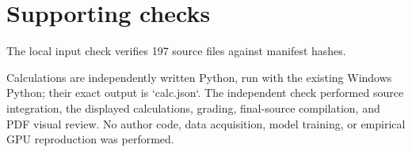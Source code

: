 \documentclass[10pt]{article}
\begin{document}
\section*{Supporting checks}
The local input check verifies 197 source files against manifest hashes.\par
Calculations are independently written Python, run with the existing Windows Python; their exact output is `calc.json`. The independent check performed source integration, the displayed calculations, grading, final-source compilation, and PDF visual review. No author code, data acquisition, model training, or empirical GPU reproduction was performed.\par
\end{document}
